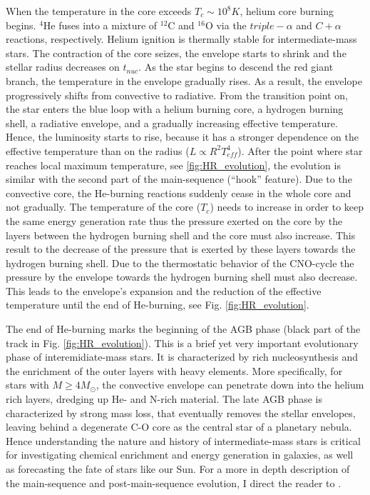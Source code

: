 When the temperature in the core exceeds $T_c \sim 10^8 K$, helium core burning begins. $^4$He fuses into a mixture of $^{12}$C and $^{16
}$O via the $triple- \alpha$ and $C+\alpha$ reactions, respectively. Helium ignition is thermally stable for intermediate-mass stars. The contraction of the core seizes, the envelope starts to shrink and the stellar radius decreases on $t_{nuc}$. As the star begins to descend the red giant branch, the temperature in the envelope gradually rises. As a result, the envelope progressively shifts from convective to radiative. From the transition point on, the star enters the blue loop with a helium burning core, a hydrogen burning shell, a radiative envelope, and a gradually increasing effective temperature.  Hence, the luminosity starts to rise, because it has a stronger dependence on the effective temperature than on the radius ($L \propto R^2 T_{eff}^4$). After the point where star reaches local maximum temperature, see \cref{fig:HR_evolution}, the evolution is similar with the second part of the main-sequence (``hook'' feature). Due to the convective core, the He-burning reactions suddenly cease in the whole core and not gradually. The temperature of the core ($T_c$) needs to increase in order to keep the same energy generation rate thus the pressure exerted on the core by the layers between the hydrogen burning shell and the core must also increase. This result to the decrease of the pressure that is exerted by these layers towards the hydrogen burning shell. Due to the thermostatic behavior of the CNO-cycle the pressure by the envelope towards the hydrogen burning shell must also decrease. This leads to the envelope's expansion and the reduction of the effective temperature until the end of He-burning, see Fig. \ref{fig:HR_evolution}.

The end of He-burning marks the beginning of the AGB phase (black part of the track in Fig. \ref{fig:HR_evolution}). This is a brief yet very important evolutionary phase of interemidiate-mass stars. It is characterized by rich nucleosynthesis and the enrichment of the outer layers with heavy elements. More specifically, for stars with $M \geq 4M_{\odot}$, the convective envelope can penetrate down into the helium rich layers, dredging up He- and N-rich material. The late AGB phase is characterized by strong mass loss, that eventually removes the stellar envelopes, leaving behind a degenerate C-O core as the central star of a planetary nebula\citep{pols2011stellar}. Hence understanding the nature and history of intermediate-mass stars is critical for investigating chemical enrichment and energy generation in galaxies, as well as forecasting the fate of stars like our Sun. For a more in depth description of the main-sequence and post-main-sequence evolution, I direct the reader to \cite{pols2011stellar}.


